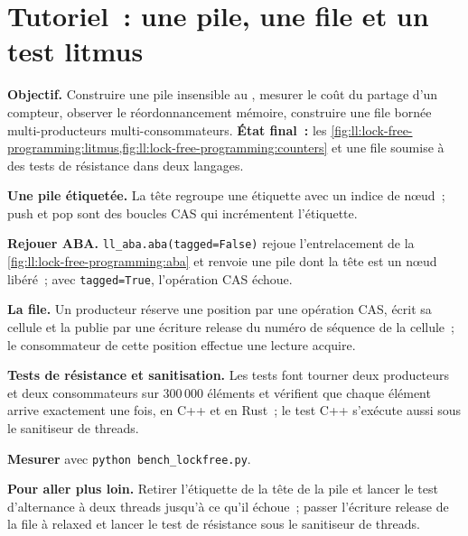 \section{Tutoriel~: une pile, une file et un test litmus}\label{tut:ll:lock-free-programming:tut}

\begin{tutorial}
\textbf{Objectif.} Construire une pile  insensible au , mesurer le coût du partage d'un compteur, observer le
réordonnancement mémoire, construire une file bornée multi-producteurs multi-consommateurs. \textbf{État final~:}
les \cref{fig:ll:lock-free-programming:litmus,fig:ll:lock-free-programming:counters} et une file soumise à des tests de résistance dans deux langages.
\begin{tutsteps}
\item \textbf{Une pile étiquetée.} La tête regroupe une étiquette avec un indice de nœud~; push et pop sont des boucles CAS qui incrémentent l'étiquette.
\label{lst:ll:lock-free-programming:stack}
\item \textbf{Rejouer ABA.} \texttt{ll\_aba.aba(tagged=False)} rejoue l'entrelacement de la \cref{fig:ll:lock-free-programming:aba}
et renvoie une pile dont la tête est un nœud libéré~; avec \texttt{tagged=True}, l'opération CAS échoue.
\item \textbf{La file.} Un producteur réserve une position par une opération CAS, écrit sa cellule et la publie par une
écriture release du numéro de séquence de la cellule~; le consommateur de cette position effectue une lecture acquire.
\label{lst:ll:lock-free-programming:push}
\item \textbf{Tests de résistance et sanitisation.} Les tests font tourner deux producteurs et deux consommateurs sur 300\,000 éléments et vérifient
que chaque élément arrive exactement une fois, en C++ et en Rust~; le test C++ s'exécute aussi sous le sanitiseur de threads.
\item \textbf{Mesurer} avec \texttt{python bench\_lockfree.py}.
\end{tutsteps}
\textbf{Pour aller plus loin.} Retirer l'étiquette de la tête de la pile et lancer le test d'alternance à deux threads jusqu'à ce qu'il échoue~; passer
l'écriture release de la file à relaxed et lancer le test de résistance sous le sanitiseur de threads.
\end{tutorial}

